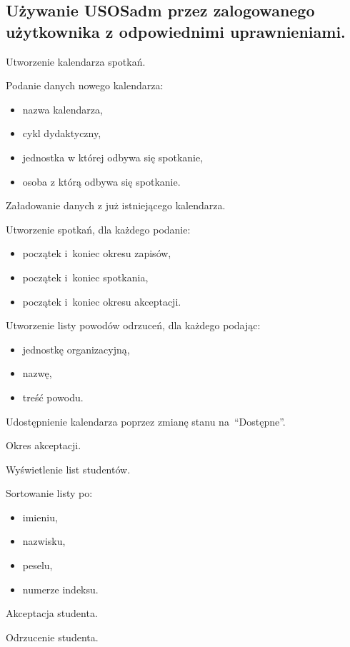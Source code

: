 \documentclass[licencjacka]{pracamgr}
\begin{document}
\subsection{Używanie USOSadm przez zalogowanego użytkownika z odpowiednimi uprawnieniami.}
	\begin{step}
		\item Utworzenie kalendarza spotkań.
			\begin{step}
				\item Podanie danych nowego kalendarza:
					\begin{itemize}
						\item nazwa kalendarza,
						\item cykl dydaktyczny,
						\item jednostka w której odbywa się spotkanie,
						\item osoba z którą odbywa się spotkanie.
					\end{itemize} 
				\item Załadowanie danych z już istniejącego kalendarza.
			\end{step}
				\item Utworzenie spotkań, dla każdego podanie:
					\begin{itemize}
						\item początek i~koniec okresu zapisów,
						\item początek i~koniec spotkania,
						\item początek i~koniec okresu akceptacji.
					\end{itemize}
				\item Utworzenie listy powodów odrzuceń, dla każdego podając:
					\begin{itemize}
						\item jednostkę organizacyjną,
						\item nazwę,
						\item treść powodu.
					\end{itemize}
		\item Udostępnienie kalendarza poprzez zmianę stanu na~\enquote{Dostępne}.
		\item Okres akceptacji.
			\begin{step}
				\item Wyświetlenie list studentów.
					\begin{step}
						\item Sortowanie listy po:
							\begin{itemize}
								\item imieniu,
								\item nazwisku,
								\item peselu,
								\item numerze indeksu.
						 	\end{itemize}
					\end{step}
				\item Akceptacja studenta.
				\item Odrzucenie studenta. 
			\end{step}
	\end{step}
	
\end{document}
